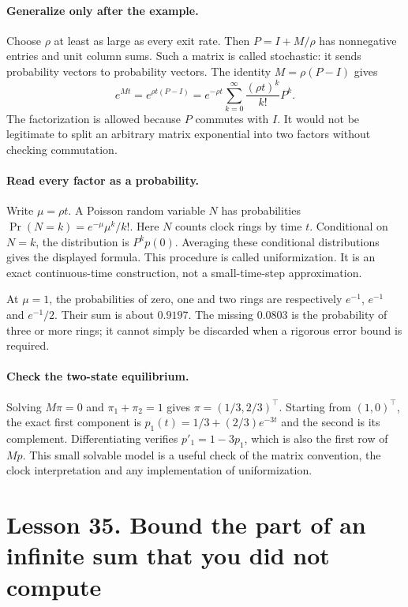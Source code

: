 \documentclass[11pt]{article}
\begin{document}
\paragraph{Generalize only after the example.}
Choose $\rho$ at least as large as every exit rate. Then $P=I+M/\rho$
has nonnegative entries and unit column sums. Such a matrix is called
stochastic: it sends probability vectors to probability vectors. The identity
$M=\rho(P-I)$ gives
\[
 e^{Mt}=e^{\rho t(P-I)}
 =e^{-\rho t}\sum_{k=0}^\infty\frac{(\rho t)^k}{k!}P^k.
\]
The factorization is allowed because $P$ commutes with $I$.
It would not be legitimate to split an arbitrary matrix exponential into
two factors without checking commutation.

\paragraph{Read every factor as a probability.}
Write $\mu=\rho t$. A Poisson random variable $N$ has probabilities
$\Pr(N=k)=e^{-\mu}\mu^k/k!$. Here $N$ counts clock rings by time $t$.
Conditional on $N=k$, the distribution is $P^kp(0)$. Averaging these
conditional distributions gives the displayed formula. This procedure is
called uniformization. It is an exact continuous-time construction, not a
small-time-step approximation.

At $\mu=1$, the probabilities of zero, one and two rings are respectively
$e^{-1}$, $e^{-1}$ and $e^{-1}/2$. Their sum is about $0.9197$.
The missing $0.0803$ is the probability of three or more rings; it cannot
simply be discarded when a rigorous error bound is required.

\paragraph{Check the two-state equilibrium.}
Solving $M\pi=0$ and $\pi_1+\pi_2=1$ gives $\pi=(1/3,2/3)^\top$.
Starting from $(1,0)^\top$, the exact first component is
$p_1(t)=1/3+(2/3)e^{-3t}$ and the second is its complement.
Differentiating verifies $p'_1=1-3p_1$, which is also the first row of
$Mp$. This small solvable model is a useful check of the matrix convention,
the clock interpretation and any implementation of uniformization.

\section*{Lesson 35. Bound the part of an infinite sum that you did not compute}
\end{document}
